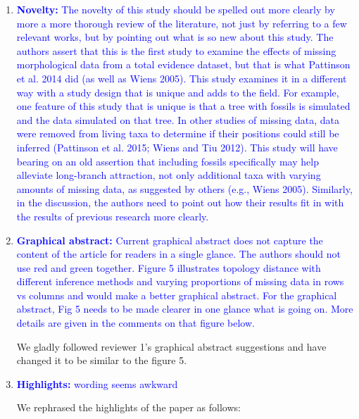 \documentclass[12pt,letterpaper]{article}
\begin{document}
\begin{enumerate}
\item{\textcolor{blue}{\textbf{Novelty:} The novelty of this study should be spelled out more clearly by more a more thorough review of the literature, not just by referring to a few relevant works, but by pointing out what is so new about this study.
The authors assert that this is the first study to examine the effects of missing morphological data from a total evidence dataset, but that is what Pattinson et al. 2014 did (as well as Wiens 2005).
This study examines it in a different way with a study design that is unique and adds to the field. For example, one feature of this study that is unique is that a tree with fossils is simulated and the data simulated on that tree.
In other studies of missing data, data were removed from living taxa to determine if their positions could still be inferred (Pattinson et al. 2015; Wiens and Tiu 2012).
This study will have bearing on an old assertion that including fossils specifically may help alleviate long-branch attraction, not only additional taxa with varying amounts of missing data, as suggested by others (e.g., Wiens 2005).
Similarly, in the discussion, the authors need to point out how their results fit in with the results of previous research more clearly. }}

\item{\textcolor{blue}{\textbf{Graphical abstract:} Current graphical abstract does not capture the content of the article for readers in a single glance.
The authors should not use red and green together.
Figure 5 illustrates topology distance with different inference methods and varying proportions of missing data in rows vs columns and would make a better graphical abstract.
For the graphical abstract, Fig 5 needs to be made clearer in one glance what is going on.
More details are given in the comments on that figure below.}}

We gladly followed reviewer 1's graphical abstract suggestions and have changed it to be similar to the figure 5. %

\item{\textcolor{blue}{\textbf{Highlights:} wording seems awkward}}

We rephrased the highlights of the paper as follows: %


\end{enumerate}
\end{document}
